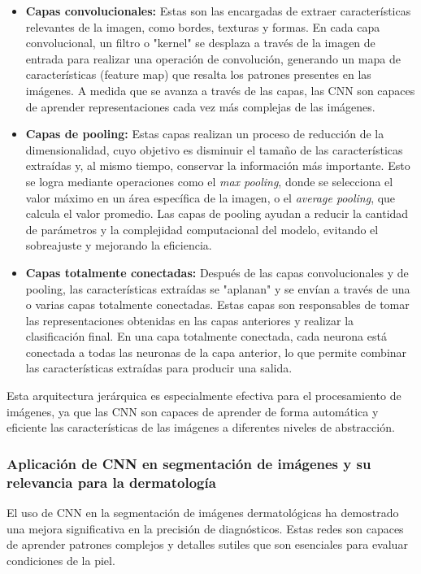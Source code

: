 \begin{itemize}
    \item \textbf{Capas convolucionales:} Estas son las encargadas de extraer características relevantes de la imagen, como bordes, texturas y formas. En cada capa convolucional, un filtro o "kernel" se desplaza a través de la imagen de entrada para realizar una operación de convolución, generando un mapa de características (feature map) que resalta los patrones presentes en las imágenes. A medida que se avanza a través de las capas, las CNN son capaces de aprender representaciones cada vez más complejas de las imágenes. \parencite{krizhevsky2012}
    
    \item \textbf{Capas de pooling:} Estas capas realizan un proceso de reducción de la dimensionalidad, cuyo objetivo es disminuir el tamaño de las características extraídas y, al mismo tiempo, conservar la información más importante. Esto se logra mediante operaciones como el \textit{max pooling}, donde se selecciona el valor máximo en un área específica de la imagen, o el \textit{average pooling}, que calcula el valor promedio. Las capas de pooling ayudan a reducir la cantidad de parámetros y la complejidad computacional del modelo, evitando el sobreajuste y mejorando la eficiencia. \parencite{krizhevsky2012}
    
    \item \textbf{Capas totalmente conectadas:} Después de las capas convolucionales y de pooling, las características extraídas se "aplanan" y se envían a través de una o varias capas totalmente conectadas. Estas capas son responsables de tomar las representaciones obtenidas en las capas anteriores y realizar la clasificación final. En una capa totalmente conectada, cada neurona está conectada a todas las neuronas de la capa anterior, lo que permite combinar las características extraídas para producir una salida. \parencite{krizhevsky2012}
\end{itemize}

Esta arquitectura jerárquica es especialmente efectiva para el procesamiento de imágenes, ya que las CNN son capaces de aprender de forma automática y eficiente las características de las imágenes a diferentes niveles de abstracción. \parencite{krizhevsky2012}

\subsubsection{Aplicación de CNN en segmentación de imágenes y su relevancia para la dermatología}
El uso de CNN en la segmentación de imágenes dermatológicas ha demostrado una mejora significativa en la precisión de diagnósticos. Estas redes son capaces de aprender patrones complejos y detalles sutiles que son esenciales para evaluar condiciones de la piel. \parencite{esteva2017}

